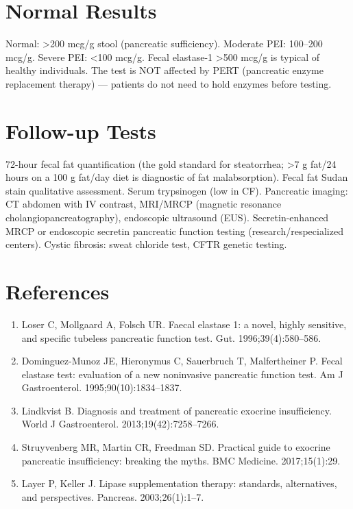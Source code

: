 \section*{Normal Results}
Normal: >200 mcg/g stool (pancreatic sufficiency). Moderate PEI: 100--200 mcg/g. Severe PEI: <100 mcg/g. Fecal elastase-1 >500 mcg/g is typical of healthy individuals. The test is NOT affected by PERT (pancreatic enzyme replacement therapy) --- patients do not need to hold enzymes before testing.
\section*{Follow-up Tests}
72-hour fecal fat quantification (the gold standard for steatorrhea; >7 g fat/24 hours on a 100 g fat/day diet is diagnostic of fat malabsorption). Fecal fat Sudan stain qualitative assessment. Serum trypsinogen (low in CF). Pancreatic imaging: CT abdomen with IV contrast, MRI/MRCP (magnetic resonance cholangiopancreatography), endoscopic ultrasound (EUS). Secretin-enhanced MRCP or endoscopic secretin pancreatic function testing (research/respecialized centers). Cystic fibrosis: sweat chloride test, CFTR genetic testing.
\section*{References}
\begin{enumerate}
  \item Loser C, Mollgaard A, Folsch UR. Faecal elastase 1: a novel, highly sensitive, and specific tubeless pancreatic function test. Gut. 1996;39(4):580--586.
  \item Dominguez-Munoz JE, Hieronymus C, Sauerbruch T, Malfertheiner P. Fecal elastase test: evaluation of a new noninvasive pancreatic function test. Am J Gastroenterol. 1995;90(10):1834--1837.
  \item Lindkvist B. Diagnosis and treatment of pancreatic exocrine insufficiency. World J Gastroenterol. 2013;19(42):7258--7266.
  \item Struyvenberg MR, Martin CR, Freedman SD. Practical guide to exocrine pancreatic insufficiency: breaking the myths. BMC Medicine. 2017;15(1):29.
  \item Layer P, Keller J. Lipase supplementation therapy: standards, alternatives, and perspectives. Pancreas. 2003;26(1):1--7.
\end{enumerate}
\clearpage
